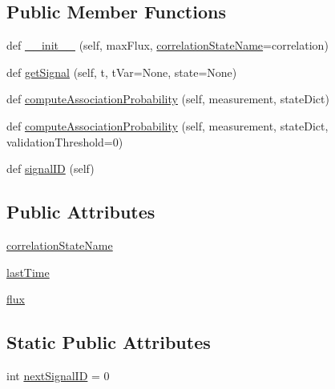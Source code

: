 \subsection*{Public Member Functions}
\begin{DoxyCompactItemize}
\item 
def \hyperlink{classmodest_1_1signals_1_1poissonsource_1_1DynamicPoissonSource_ad55e47bfd1e3b30e978636a4fbc351eb}{\+\_\+\+\_\+init\+\_\+\+\_\+} (self, max\+Flux, \hyperlink{classmodest_1_1signals_1_1poissonsource_1_1DynamicPoissonSource_ac7f62303bb8a417a1ddefb032c707bcd}{correlation\+State\+Name}=\textquotesingle{}correlation\textquotesingle{})
\item 
def \hyperlink{classmodest_1_1signals_1_1poissonsource_1_1DynamicPoissonSource_a01804453d22cab5811218a98557a8b0c}{get\+Signal} (self, t, t\+Var=None, state=None)
\item 
def \hyperlink{classmodest_1_1signals_1_1poissonsource_1_1DynamicPoissonSource_a6c8820d8007c848d745f9313efdb970c}{compute\+Association\+Probability} (self, measurement, state\+Dict)
\item 
def \hyperlink{classmodest_1_1signals_1_1signalsource_1_1SignalSource_a3d32dbed840ea9ac775b226f0a654831}{compute\+Association\+Probability} (self, measurement, state\+Dict, validation\+Threshold=0)
\item 
def \hyperlink{classmodest_1_1signals_1_1signalsource_1_1SignalSource_a9a64c6a9c2954f6ad61e4ca3518ea8ab}{signal\+ID} (self)
\end{DoxyCompactItemize}
\subsection*{Public Attributes}
\begin{DoxyCompactItemize}
\item 
\hyperlink{classmodest_1_1signals_1_1poissonsource_1_1DynamicPoissonSource_ac7f62303bb8a417a1ddefb032c707bcd}{correlation\+State\+Name}
\item 
\hyperlink{classmodest_1_1signals_1_1poissonsource_1_1PoissonSource_a34395fc83bd8743a0a5ee69f9392a606}{last\+Time}
\item 
\hyperlink{classmodest_1_1signals_1_1poissonsource_1_1PoissonSource_a6f2c657ad936b921715d826ac74f7fe5}{flux}
\end{DoxyCompactItemize}
\subsection*{Static Public Attributes}
\begin{DoxyCompactItemize}
\item 
int \hyperlink{classmodest_1_1signals_1_1signalsource_1_1SignalSource_a453eafb550b551adbec0903deb63dfce}{next\+Signal\+ID} = 0
\end{DoxyCompactItemize}
